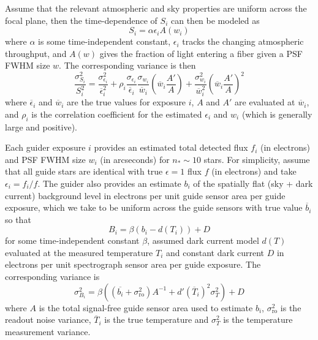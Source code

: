 \documentclass[11pt]{article}
\begin{document}
Assume that the relevant atmospheric and sky properties are uniform across the focal plane, then the time-dependence of $S_i$ can then be modeled as
\begin{equation}
S_i = \alpha \epsilon_i A(w_i)
\end{equation}
where $\alpha$ is some time-independent constant, $\epsilon_i$ tracks the changing atmospheric throughput, and $A(w)$ gives the fraction of light entering a fiber given a PSF FWHM size $w$. The corresponding variance is then
\begin{equation}
\frac{\sigma_{S_i}^2}{S_i^2} =
\frac{\sigma_{\epsilon_i}^2}{\overline{\epsilon}_i^2} +
\rho_i\frac{\sigma_{\epsilon_i}}{\overline{\epsilon}_i}\frac{\sigma_{w_i}}{\overline{w}_i} \left( \overline{w}_i\frac{A'}{A}\right) +
\frac{\sigma_{w_i}^2}{\overline{w}_i^2} \left( \overline{w}_i\frac{A'}{A}\right)^2
\label{eqn:sig-error}
\end{equation}
where $\overline{\epsilon}_i$ and $\overline{w}_i$ are the true values for exposure $i$, $A$ and $A'$ are evaluated at $\overline{w}_i$, and $\rho_i$ is the correlation coefficient for the estimated $\epsilon_i$ and $w_i$ (which is generally large and positive).

Each guider exposure $i$ provides an estimated total detected flux $f_i$ (in electrons) and PSF FWHM size $w_i$ (in arcseconds) for $n_\ast \sim 10$ stars.  For simplicity, assume that all guide stars are identical with true $\epsilon = 1$ flux $f$ (in electrons) and take $\epsilon_i = f_i/f$. The guider also provides an estimate $b_i$ of the spatially flat (sky + dark current) background level in electrons per unit guide sensor area per guide exposure, which we take to be uniform across the guide sensors with true value $\overline{b}_i$ so that
\begin{equation}
B_i = \beta (b_i - d(T_i)) + D
\end{equation}
for some time-independent constant $\beta$, assumed dark current model $d(T)$ evaluated at the measured temperature $T_i$ and constant dark current $D$ in electrons per unit spectrograph sensor area per guide exposure. The corresponding variance is
\begin{equation}
\sigma_{B_i}^2 = \beta\left((\overline{b_i}  + \sigma_{\text{ro}}^2)A^{-1} + d'(\overline{T}_i)^2 \sigma_T^2\right) + D
\end{equation}
where $A$ is the total signal-free guide sensor area used to estimate $b_i$, $\sigma_{\text{ro}}^2$ is the readout noise variance, $\overline{T}_i$ is the true temperature and $\sigma_T^2$ is the temperature measurement variance.
\end{document}

